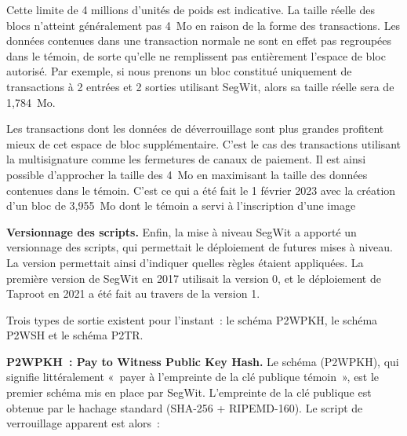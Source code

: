 Cette limite de 4 millions d'unités de poids est indicative. La taille réelle des blocs n'atteint généralement pas 4~Mo en raison de la forme des transactions. Les données contenues dans une transaction normale ne sont en effet pas regroupées dans le témoin, de sorte qu'elle ne remplissent pas entièrement l'espace de bloc autorisé. Par exemple, si nous prenons un bloc constitué uniquement de transactions à 2 entrées et 2 sorties utilisant SegWit, alors sa taille réelle sera de 1,784~Mo.

Les transactions dont les données de déverrouillage sont plus grandes profitent mieux de cet espace de bloc supplémentaire. C'est le cas des transactions utilisant la multisignature comme les fermetures de canaux de paiement. Il est ainsi possible d'approcher la taille des 4~Mo en maximisant la taille des données contenues dans le témoin. C'est ce qui a été fait le 1\ier{} février 2023 avec la création d'un bloc de 3,955~Mo dont le témoin a servi à l'inscription d'une image


\textbf{Versionnage des scripts.} Enfin, la mise à niveau SegWit a apporté un versionnage des scripts, qui permettait le déploiement de futures mises à niveau. La version permettait ainsi d'indiquer quelles règles étaient appliquées. La première version de SegWit en 2017 utilisait la version 0, et le déploiement de Taproot en 2021 a été fait au travers de la version 1.


Trois types de sortie existent pour l'instant~: le schéma P2WPKH, le schéma P2WSH et le schéma P2TR.

\textbf{P2WPKH~: Pay to Witness Public Key Hash.} Le schéma  (P2WPKH), qui signifie littéralement «~payer à l'empreinte de la clé publique témoin~», est le premier schéma mis en place par SegWit. L'empreinte de la clé publique est obtenue par le hachage standard (SHA-256 + RIPEMD-160). Le script de verrouillage apparent est alors~:

